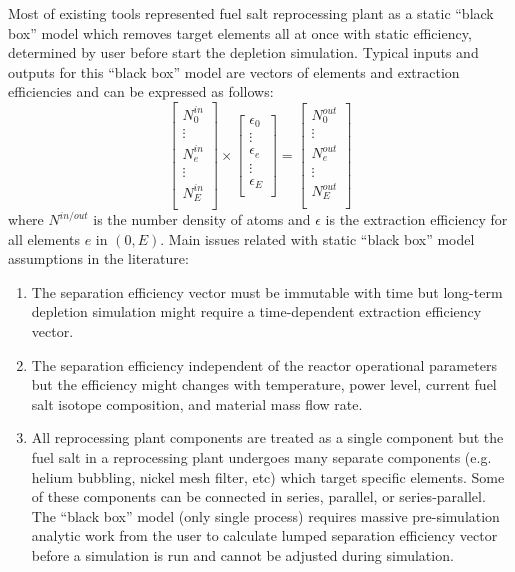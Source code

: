 Most of existing tools represented fuel salt reprocessing plant as a static 
``black box'' model which removes target elements all at once with static 
efficiency, determined by user before start the depletion simulation. 
Typical inputs and outputs for this ``black box'' model are vectors of 
elements and extraction efficiencies and can be expressed as follows:
\begin{equation}
\begin{bmatrix}
N^{in}_{0} \\ \vdots \\ N^{in}_{e} \\ \vdots \\ N^{in}_{E} \\
\end{bmatrix} 
\times
\begin{bmatrix}
\epsilon_{0} \\ \vdots \\ \epsilon_{e} \\ \vdots \\ \epsilon_{E} \\
\end{bmatrix} =
\begin{bmatrix}
N^{out}_{0}\\ \vdots \\ N^{out}_{e} \\ \vdots \\N^{out}_{E}  \\
\end{bmatrix}
\end{equation}
where $N^{in/out}$ is the number density of atoms and $\epsilon$ is the 
extraction efficiency for all elements $e$ in $(0, E)$. Main issues related 
with static ``black box'' model assumptions in the literature: 
\begin{enumerate}
	\item The separation efficiency vector must be immutable with time but  
	long-term depletion simulation might require a time-dependent extraction 
	efficiency vector.
	\item The separation efficiency independent of the reactor operational 
	parameters but the efficiency might changes with temperature, power level, 
	current fuel salt isotope composition, and material mass flow rate.
	\item All reprocessing plant components are treated as a single component 
	but the fuel salt in a reprocessing plant undergoes many separate components 
	(e.g. helium bubbling, nickel mesh filter, etc) which target specific 
	elements. Some of these components can be connected in series, parallel, or 
	series-parallel. The ``black box'' model (only single process) requires 
	massive pre-simulation analytic work from the user to calculate lumped 
	separation 	efficiency vector before a simulation is run and cannot be 
	adjusted during simulation.	
\end{enumerate}

